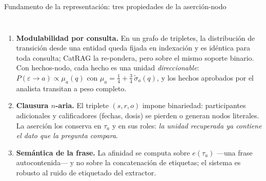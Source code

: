 \documentclass[aspectratio=169,10pt]{beamer}
\newcommand{\bien}[1]{\textcolor{verde}{\textbf{#1}}}
\newcommand{\mal}[1]{\textcolor{teja}{\textbf{#1}}}
\begin{document}
\begin{frame}{Fundamento de la representación: tres propiedades de la aserción-nodo}
\begin{columns}[T]
\begin{enumerate}\footnotesize
\item \textbf{Modulabilidad por consulta.} En un grafo de tripletes, la
  distribución de transición desde una entidad queda fijada en indexación y es
  idéntica para toda consulta; CatRAG la re-pondera, pero sobre el mismo
  soporte binario. Con hechos-nodo, cada hecho es una unidad
  \emph{direccionable}: $P(\varepsilon\!\to\!a)\propto\mu_a(q)$ con
  $\mu_a=\tfrac14+\tfrac34\,\tilde\sigma_a(q)$, y los hechos aprobados por el
  analista transitan a peso completo.
\item \textbf{Clausura $n$-aria.} El triplete $(s,r,o)$ impone binariedad:
  participantes adicionales y calificadores (fechas, dosis) se pierden o
  generan nodos literales. La aserción los conserva en $\tau_a$ y en sus
  roles: \emph{la unidad recuperada ya contiene el dato que la pregunta
  compara}.
\item \textbf{Semántica de la frase.} La afinidad se computa sobre
  $e(\tau_a)$ ---una frase autocontenida--- y no sobre la concatenación de
  etiquetas; el sistema es robusto al ruido de etiquetado del extractor.
\end{enumerate}
\centering
{}
\end{columns}
\end{frame}
\end{document}
